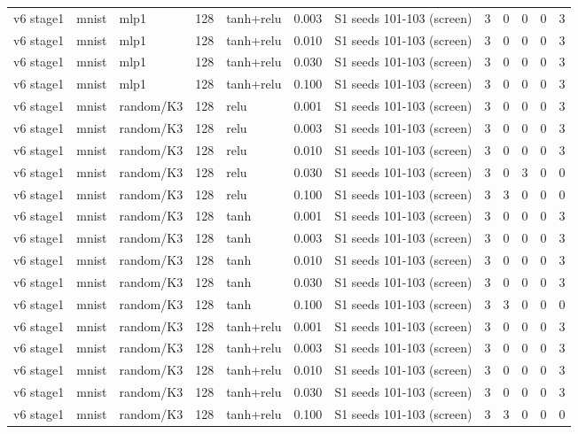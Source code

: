 \begin{table}[htbp]
{\begin{tabular}{@{}lllrlrlrrrrr@{}}
v6 stage1 & mnist & mlp1 & 128 & tanh+relu & 0.003 & S1 seeds 101-103 (screen) & 3 & 0 & 0 & 0 & 3 \\
v6 stage1 & mnist & mlp1 & 128 & tanh+relu & 0.010 & S1 seeds 101-103 (screen) & 3 & 0 & 0 & 0 & 3 \\
v6 stage1 & mnist & mlp1 & 128 & tanh+relu & 0.030 & S1 seeds 101-103 (screen) & 3 & 0 & 0 & 0 & 3 \\
v6 stage1 & mnist & mlp1 & 128 & tanh+relu & 0.100 & S1 seeds 101-103 (screen) & 3 & 0 & 0 & 0 & 3 \\
v6 stage1 & mnist & random/K3 & 128 & relu & 0.001 & S1 seeds 101-103 (screen) & 3 & 0 & 0 & 0 & 3 \\
v6 stage1 & mnist & random/K3 & 128 & relu & 0.003 & S1 seeds 101-103 (screen) & 3 & 0 & 0 & 0 & 3 \\
v6 stage1 & mnist & random/K3 & 128 & relu & 0.010 & S1 seeds 101-103 (screen) & 3 & 0 & 0 & 0 & 3 \\
v6 stage1 & mnist & random/K3 & 128 & relu & 0.030 & S1 seeds 101-103 (screen) & 3 & 0 & 3 & 0 & 0 \\
v6 stage1 & mnist & random/K3 & 128 & relu & 0.100 & S1 seeds 101-103 (screen) & 3 & 3 & 0 & 0 & 0 \\
v6 stage1 & mnist & random/K3 & 128 & tanh & 0.001 & S1 seeds 101-103 (screen) & 3 & 0 & 0 & 0 & 3 \\
v6 stage1 & mnist & random/K3 & 128 & tanh & 0.003 & S1 seeds 101-103 (screen) & 3 & 0 & 0 & 0 & 3 \\
v6 stage1 & mnist & random/K3 & 128 & tanh & 0.010 & S1 seeds 101-103 (screen) & 3 & 0 & 0 & 0 & 3 \\
v6 stage1 & mnist & random/K3 & 128 & tanh & 0.030 & S1 seeds 101-103 (screen) & 3 & 0 & 0 & 0 & 3 \\
v6 stage1 & mnist & random/K3 & 128 & tanh & 0.100 & S1 seeds 101-103 (screen) & 3 & 3 & 0 & 0 & 0 \\
v6 stage1 & mnist & random/K3 & 128 & tanh+relu & 0.001 & S1 seeds 101-103 (screen) & 3 & 0 & 0 & 0 & 3 \\
v6 stage1 & mnist & random/K3 & 128 & tanh+relu & 0.003 & S1 seeds 101-103 (screen) & 3 & 0 & 0 & 0 & 3 \\
v6 stage1 & mnist & random/K3 & 128 & tanh+relu & 0.010 & S1 seeds 101-103 (screen) & 3 & 0 & 0 & 0 & 3 \\
v6 stage1 & mnist & random/K3 & 128 & tanh+relu & 0.030 & S1 seeds 101-103 (screen) & 3 & 0 & 0 & 0 & 3 \\
v6 stage1 & mnist & random/K3 & 128 & tanh+relu & 0.100 & S1 seeds 101-103 (screen) & 3 & 3 & 0 & 0 & 0 \\

\end{tabular}}
\end{table}

